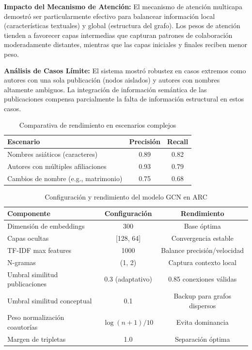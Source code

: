 \documentclass{article}
\begin{document}
\textbf{Impacto del Mecanismo de Atención:}
El mecanismo de atención multicapa demostró ser particularmente efectivo para balancear información local (características textuales) y global (estructura del grafo). Los pesos de atención tienden a favorecer capas intermedias que capturan patrones de colaboración moderadamente distantes, mientras que las capas iniciales y finales reciben menor peso.

\textbf{Análisis de Casos Límite:}
El sistema mostró robustez en casos extremos como autores con una sola publicación (nodos aislados) y autores con nombres altamente ambiguos. La integración de información semántica de las publicaciones compensa parcialmente la falta de información estructural en estos casos.

\begin{table}[h]
\centering
\caption{Comparativa de rendimiento en escenarios complejos}
\label{tab:rendimiento}
\begin{tabular}{@{}lcc@{}}
\toprule
Escenario & Precisión & Recall \\
\midrule
Nombres asiáticos (caracteres) & 0.89 & 0.82 \\
Autores con múltiples afiliaciones & 0.93 & 0.79 \\
Cambios de nombre (e.g., matrimonio) & 0.75 & 0.68 \\
\bottomrule
\end{tabular}
\end{table}

\begin{table}[h]
\centering
\caption{Configuración y rendimiento del modelo GCN en ARC}
\label{tab:gcn_config}
\begin{tabular}{@{}lcc@{}}
\toprule
Componente & Configuración & Rendimiento \\
\midrule
Dimensión de embeddings & 300 & Base óptima \\
Capas ocultas & [128, 64] & Convergencia estable \\
TF-IDF max features & 1000 & Balance precisión/velocidad \\
N-gramas & (1, 2) & Captura contexto local \\
Umbral similitud publicaciones & 0.3 (adaptativo) & 0.85 conexiones válidas \\
Umbral similitud conceptual & 0.1 & Backup para grafos dispersos \\
Peso normalización coautorías & $\log(n+1)/10$ & Evita dominancia \\
Margen de tripletas & 1.0 & Separación óptima \\
\bottomrule
\end{tabular}
\end{table}
\end{document}
